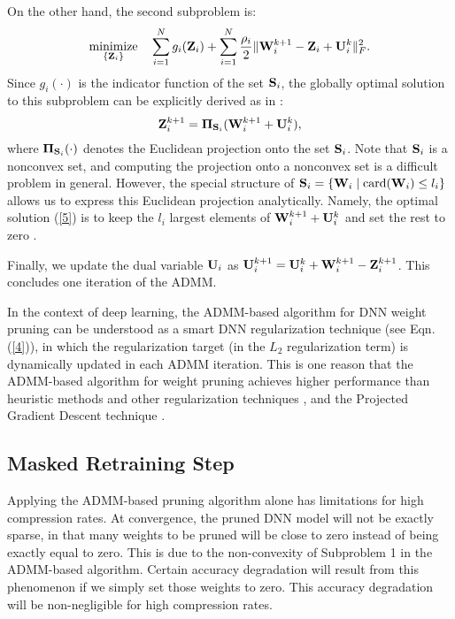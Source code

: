 \documentclass{article} %
\begin{document}
On the other hand, the second subproblem is:
\begin{equation*}
 \underset{ \{{\bf{Z}}_{i} \}}{\text{minimize}}
\ \ \ \sum_{i=1}^{N} g_{i}({\bf{Z}}_{i})+\sum_{i=1}^{N} \frac{\rho_{i}}{2} \| {\bf{W}}_{i}^{k+1}-{\bf{Z}}_{i}+{\bf{U}}_{i}^{k} \|_{F}^{2}. \\
\end{equation*}
Since $g_{i}(\cdot)$ is the indicator function of the set ${\bf{S}}_{i}$, the globally optimal solution to this subproblem can be explicitly derived as in \citet{boyd2011}:
\begin{equation}
\label{5}
  {\bf{Z}}_{i}^{k+1} = {{\bf{\Pi}}_{{\bf{S}}_{i}}}({\bf{W}}_{i}^{k+1}+{\bf{U}}_{i}^{k}),
\end{equation}
where ${{\bf{\Pi}}_{{\bf{S}}_{i}}(\cdot)}$ denotes the Euclidean projection onto the set ${\bf{S}}_{i}$. Note that ${\bf{S}}_{i}$ is a nonconvex set, and computing the projection onto a nonconvex set is a difficult problem in general. However, the special structure of ${\bf{S}}_{i}= \{{\bf{W}}_i\mid \mathrm{card}({\bf{W}}_i)\le l_{i} \}$ allows us to express this Euclidean projection analytically. Namely, the optimal solution (\ref{5}) is to keep the $l_{i}$ largest elements of ${\bf{W}}_{i}^{k+1}+{\bf{U}}_{i}^{k}$ and set the rest to zero \citep{boyd2011}.  

Finally, we update the dual variable ${\bf{U}}_{i}$ as ${\bf{U}}_{i}^{k+1}={\bf{U}}_{i}^{k}+{\bf{W}}_{i}^{k+1}-{\bf{Z}}_{i}^{k+1}$. This concludes one iteration of the ADMM. 

In the context of deep learning, the ADMM-based algorithm for DNN weight pruning can be understood as a smart DNN regularization technique (see Eqn. (\ref{4})), in which the regularization target (in the $L_2$ regularization term) is dynamically updated in each ADMM iteration. This is one reason that the ADMM-based algorithm for weight pruning achieves higher performance than heuristic methods and other regularization techniques \citep{wen2016learning}, and the Projected Gradient Descent technique \citep{zhang2018learning}.

\subsection{Masked Retraining Step}\label{sec:retrain}

Applying the ADMM-based pruning algorithm alone has limitations for high compression rates. 
At convergence, the pruned DNN model will not be exactly sparse, in that many weights to be pruned will be close to zero instead of being exactly equal to zero. This is due to the non-convexity of Subproblem 1 in the ADMM-based algorithm. Certain accuracy degradation will result from this phenomenon if we simply set those weights to zero. This accuracy degradation will be non-negligible for high compression rates.
\end{document}
